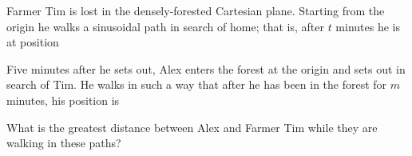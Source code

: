 Farmer Tim is lost in the densely-forested Cartesian plane. Starting from the origin he walks a sinusoidal path in search of home; that is, after $t$ minutes he is at position 

Five minutes after he sets out, Alex enters the forest at the origin and sets out in search of Tim. He walks in such a way that after he has been in the forest for $m$ minutes, his position is 

What is the greatest distance between Alex and Farmer Tim while they are walking in these paths?